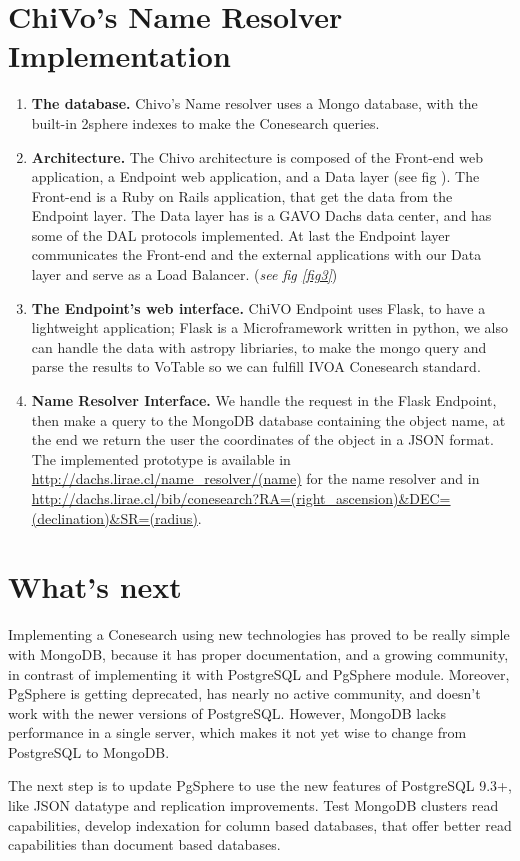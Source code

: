 \documentclass[11pt,twoside]{article}
\begin{document}
\section{ChiVo's Name Resolver Implementation}
\begin{enumerate}

\item  \textbf{The database.} Chivo's Name resolver uses a Mongo database, with the built-in 2sphere indexes 
to make the Conesearch queries. 

\item  \textbf{Architecture.}  The Chivo architecture is composed of the Front-end web application, a Endpoint web application,
and a Data layer (see fig ). The Front-end is a Ruby on Rails application, that get the data from the Endpoint layer. 
The Data layer has is a GAVO Dachs data center, and has some of the DAL protocols implemented.
At last the Endpoint layer communicates the Front-end and the external applications with our Data layer and serve as a Load Balancer. (\emph{see fig \ref{fig3}})


\item  \textbf{The Endpoint’s web interface.} ChiVO Endpoint uses Flask, to have a lightweight application; 
Flask is a Microframework written in python, we also can handle the data with astropy
libriaries, to make the mongo query and parse the results to VoTable so we can fulfill IVOA Conesearch standard.

\item \textbf{Name Resolver Interface.} We handle the request in the Flask Endpoint,
then make a query to the MongoDB database containing the object name, at the end we return the user the coordinates of the object 
in a JSON format. The implemented prototype is available in \url{http://dachs.lirae.cl/name_resolver/(name)} for the name resolver
and in \url{http://dachs.lirae.cl/bib/conesearch?RA=(right_ascension)&DEC=(declination)&SR=(radius)}.

\end{enumerate}

\section{What's next}
    Implementing a Conesearch using new technologies has proved to be really
simple with MongoDB, because it has proper documentation, 
and a growing community, in contrast of implementing it with PostgreSQL and
PgSphere module. Moreover,  PgSphere is getting deprecated, has nearly no active
community, and doesn't work with the newer versions of PostgreSQL. 
However,  MongoDB lacks performance in a single server, which makes it not yet
wise to change from PostgreSQL to MongoDB.

The next step is to update PgSphere to use the new features of PostgreSQL 9.3+, like JSON datatype and replication improvements.
Test MongoDB clusters read capabilities, develop indexation for column based databases, that offer better read capabilities than document based databases.

\end{document}
